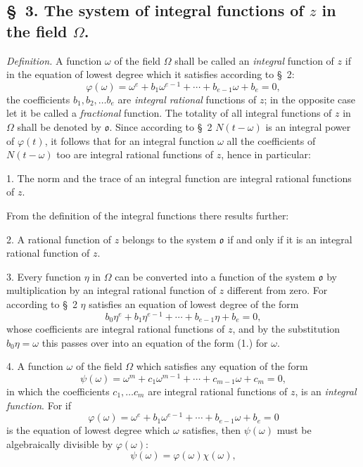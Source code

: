 \documentclass{article}
\begin{document}

\subsection*{§~3. The system of integral functions of $z$ in the field $\Omega$.}

\emph{Definition.} A function $\omega$ of the field $\Omega$ shall be called an \emph{integral} function of $z$ if in the equation of lowest degree which it satisfies according to §~2:
\[ \varphi(\omega) = \omega^{e} + b_{1}\omega^{e-1} + \cdots + b_{e-1}\omega + b_{e} = 0, \tag{1.} \]
the coefficients $b_{1}, b_{2}, \ldots b_{e}$ are \emph{integral rational} functions of $z$; in the opposite case let it be called a \emph{fractional} function. The totality of all integral functions of $z$ in $\Omega$ shall be denoted by $\mathfrak{o}$. Since according to §~2 $N(t-\omega)$ is an integral power of $\varphi(t)$, it follows that for an integral function $\omega$ all the coefficients of $N(t-\omega)$ too are integral rational functions of $z$, hence in particular:

1. The norm and the trace of an integral function are integral rational functions of $z$.

From the definition of the integral functions there results further:

2. A rational function of $z$ belongs to the system $\mathfrak{o}$ if and only if it is an integral rational function of $z$.

3. Every function $\eta$ in $\Omega$ can be converted into a function of the system $\mathfrak{o}$ by multiplication by an integral rational function of $z$ different from zero. For according to §~2 $\eta$ satisfies an equation of lowest degree of the form
\[ b_{0}\eta^{e} + b_{1}\eta^{e-1} + \cdots + b_{e-1}\eta + b_{e} = 0, \]
whose coefficients are integral rational functions of $z$, and by the substitution $b_{0}\eta = \omega$ this passes over into an equation of the form (1.) for $\omega$.

4. A function $\omega$ of the field $\Omega$ which satisfies any equation of the form
\[ \psi(\omega) = \omega^{m} + c_{1}\omega^{m-1} + \cdots + c_{m-1}\omega + c_{m} = 0, \]
in which the coefficients $c_{1}, \ldots c_{m}$ are integral rational functions of $z$, is an \emph{integral function}. For if
\[ \varphi(\omega) = \omega^{e} + b_{1}\omega^{e-1} + \cdots + b_{e-1}\omega + b_{e} = 0 \]
is the equation of lowest degree which $\omega$ satisfies, then $\psi(\omega)$ must be algebraically divisible by $\varphi(\omega)$:
\[ \psi(\omega) = \varphi(\omega)\chi(\omega), \]
\end{document}
